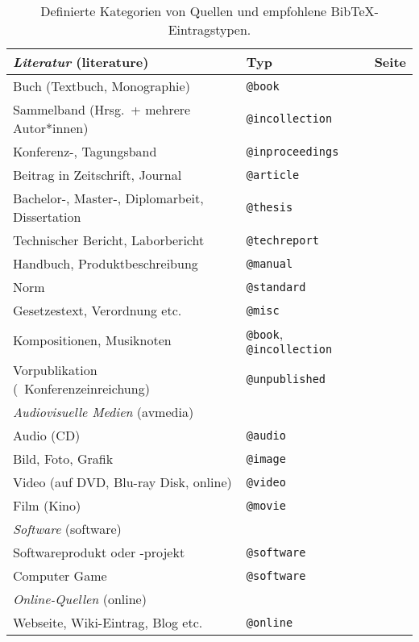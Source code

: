 \begin{table}
\caption{Definierte Kategorien von Quellen und empfohlene BibTeX-Eintragstypen.}
\label{tab:QuellenUndEintragstypen}
\centering
\begin{tabular}{llc}
	\hline
	\emph{Literatur} (\textsf{literature}) & Typ & Seite\\
	\hline
	Buch (Textbuch, Monographie) & \texttt{@book} & \pageref{sec:@book}\\
	Sammelband (Hrsg.\ + mehrere Autor*innen) & \texttt{@incollection} & \pageref{sec:@incollection} \\
	Konferenz-, Tagungsband & \texttt{@inproceedings} & \pageref{sec:@inproceedings}\\
	Beitrag in Zeitschrift, Journal & \texttt{@article} & \pageref{sec:@article}\\
	Bachelor-, Master-, Diplomarbeit, Dissertation & \texttt{@thesis} & \pageref{sec:@thesis}\\
	Technischer Bericht, Laborbericht & \texttt{@techreport} & \pageref{sec:@techreport}\\
	Handbuch, Produktbeschreibung & \texttt{@manual} & \pageref{sec:@manual}\\
	Norm & \texttt{@standard} & \pageref{sec:@standard}\\
	Gesetzestext, Verordnung etc. & \texttt{@misc} & \pageref{sec:@misc}\\
	Kompositionen, Musiknoten & \texttt{@book}, \texttt{@incollection} & \pageref{sec:Musiknoten}\\
	Vorpublikation (\zB\ Konferenzeinreichung) & \texttt{@unpublished} & \pageref{sec:@unpublished}\\
%
	\hline
	\emph{Audiovisuelle Medien} (\textsf{avmedia}) & \\
	\hline
	Audio (CD) & \texttt{@audio} & \pageref{sec:@audio}\\
	Bild, Foto, Grafik & \texttt{@image} & \pageref{sec:@image}\\
	Video (auf DVD, Blu-ray Disk, online) & \texttt{@video} & \pageref{sec:@video}\\
	Film (Kino) & \texttt{@movie} & \pageref{sec:@movie}\\
%
	\hline
	\emph{Software} (\textsf{software}) & \\
	\hline
	Softwareprodukt oder -projekt & \texttt{@software} & \pageref{sec:@software}\\
	Computer Game & \texttt{@software} & \pageref{sec:@software}\\
%
	\hline
	\emph{Online-Quellen} (\textsf{online}) & \\
	\hline
	Webseite, Wiki-Eintrag, Blog etc. & \texttt{@online} & \pageref{sec:@online-www}
\end{tabular}
\end{table}



